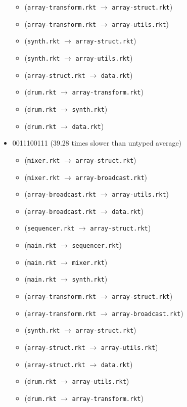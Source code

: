 \documentclass{article}
\newcommand{\mono}[1]{\texttt{#1}}
\begin{document}
\begin{itemize}
\begin{itemize}
  \item (\mono{array-transform.rkt} $\rightarrow$ \mono{array-struct.rkt})
  \item (\mono{array-transform.rkt} $\rightarrow$ \mono{array-utils.rkt})
  \item (\mono{synth.rkt} $\rightarrow$ \mono{array-struct.rkt})
  \item (\mono{synth.rkt} $\rightarrow$ \mono{array-utils.rkt})
  \item (\mono{array-struct.rkt} $\rightarrow$ \mono{data.rkt})
  \item (\mono{drum.rkt} $\rightarrow$ \mono{array-transform.rkt})
  \item (\mono{drum.rkt} $\rightarrow$ \mono{synth.rkt})
  \item (\mono{drum.rkt} $\rightarrow$ \mono{data.rkt})
  \end{itemize}
\item 0011100111 (39.28 times slower than untyped average)
  \begin{itemize}
  \item (\mono{mixer.rkt} $\rightarrow$ \mono{array-struct.rkt})
  \item (\mono{mixer.rkt} $\rightarrow$ \mono{array-broadcast.rkt})
  \item (\mono{array-broadcast.rkt} $\rightarrow$ \mono{array-utils.rkt})
  \item (\mono{array-broadcast.rkt} $\rightarrow$ \mono{data.rkt})
  \item (\mono{sequencer.rkt} $\rightarrow$ \mono{array-struct.rkt})
  \item (\mono{main.rkt} $\rightarrow$ \mono{sequencer.rkt})
  \item (\mono{main.rkt} $\rightarrow$ \mono{mixer.rkt})
  \item (\mono{main.rkt} $\rightarrow$ \mono{synth.rkt})
  \item (\mono{array-transform.rkt} $\rightarrow$ \mono{array-struct.rkt})
  \item (\mono{array-transform.rkt} $\rightarrow$ \mono{array-broadcast.rkt})
  \item (\mono{synth.rkt} $\rightarrow$ \mono{array-struct.rkt})
  \item (\mono{array-struct.rkt} $\rightarrow$ \mono{array-utils.rkt})
  \item (\mono{array-struct.rkt} $\rightarrow$ \mono{data.rkt})
  \item (\mono{drum.rkt} $\rightarrow$ \mono{array-utils.rkt})
  \item (\mono{drum.rkt} $\rightarrow$ \mono{array-transform.rkt})

\end{itemize}
\end{itemize}
\end{document}
